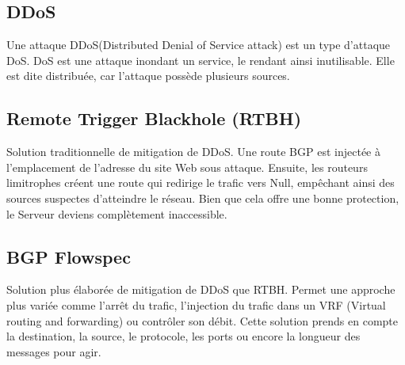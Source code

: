 \subsection{DDoS}
Une attaque DDoS(Distributed Denial of Service attack) est un type d'attaque DoS. DoS est une attaque inondant un service, le rendant ainsi inutilisable. Elle est dite distribuée, car l'attaque possède plusieurs sources.




\subsection{Remote Trigger Blackhole (RTBH)}
Solution traditionnelle de mitigation de DDoS. 
Une route BGP est injectée à l'emplacement de l’adresse du site Web sous attaque. Ensuite, les routeurs limitrophes créent une route qui redirige le trafic vers Null, empêchant ainsi des sources suspectes d'atteindre le réseau. Bien que cela offre une bonne protection, le Serveur deviens complètement inaccessible.

\subsection{BGP Flowspec}
Solution plus élaborée de mitigation de DDoS que RTBH.
Permet une approche plus variée comme l'arrêt du trafic, l'injection du trafic dans un VRF (Virtual routing and forwarding) ou contrôler son débit. Cette solution prends en compte la destination, la source, le protocole, les ports ou encore la longueur des messages pour agir.





